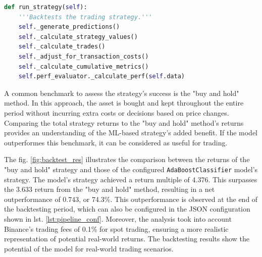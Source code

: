 \begin{lstlisting}[style=pythonstyle, language=Python, caption={\vspace*{1cm}Function of MlBacktester class for backtesting execution.},  captionpos=b, label=lst:add_features_function]
def run_strategy(self):
    '''Backtests the trading strategy.'''
    self._generate_predictions()
    self._calculate_strategy_values()
    self._calculate_trades()
    self._adjust_for_transaction_costs()
    self._calculate_cumulative_metrics()
    self.perf_evaluator._calculate_perf(self.data)

\end{lstlisting}

A common benchmark to assess the strategy's success is the "buy and hold" method.
In this approach, the asset is bought and kept throughout the entire period without incurring extra costs or decisions based on price changes.
Comparing the total strategy returns to the "buy and hold" method's returns provides an understanding of the ML-based strategy's added benefit.
If the model outperformes this benchmark, it can be considered as useful for trading.

The fig. \ref{fig:backtest_res} illustrates the comparison between the returns of the "buy and hold" strategy and those of the configured \texttt{AdaBoostClassifier} model's strategy.
The model's strategy achieved a return multiple of 4.376. This surpasses the 3.633 return from the "buy and hold" method, resulting in a net outperformance of 0.743, or 74.3\%.
This outperformance is observed at the end of the backtesting period, which can also be configured in the JSON configuration shown in lst. \ref{lst:pipeline_conf}.
Moreover, the analysis took into account Binance's trading fees of 0.1\% for spot trading, ensuring a more realistic representation of potential real-world returns.
The backtesting results show the potential of the model for real-world trading scenarios.





